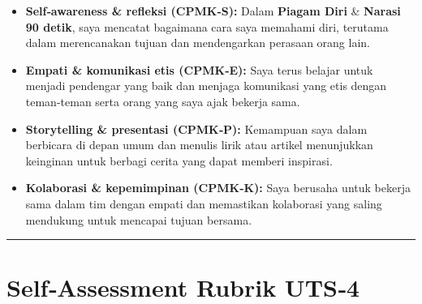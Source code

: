 \documentclass[
  letterpaper,
  DIV=11,
  numbers=noendperiod]{scrreprt}
\providecommand{\tightlist}{%
  \setlength{\itemsep}{0pt}\setlength{\parskip}{0pt}}
\begin{document}
\begin{itemize}
\tightlist
\item
  \textbf{Self‑awareness \& refleksi (CPMK‑S):} Dalam \textbf{Piagam
  Diri} \& \textbf{Narasi 90 detik}, saya mencatat bagaimana cara saya
  memahami diri, terutama dalam merencanakan tujuan dan mendengarkan
  perasaan orang lain.
\item
  \textbf{Empati \& komunikasi etis (CPMK‑E):} Saya terus belajar untuk
  menjadi pendengar yang baik dan menjaga komunikasi yang etis dengan
  teman-teman serta orang yang saya ajak bekerja sama.
\item
  \textbf{Storytelling \& presentasi (CPMK‑P):} Kemampuan saya dalam
  berbicara di depan umum dan menulis lirik atau artikel menunjukkan
  keinginan untuk berbagi cerita yang dapat memberi inspirasi.
\item
  \textbf{Kolaborasi \& kepemimpinan (CPMK‑K):} Saya berusaha untuk
  bekerja sama dalam tim dengan empati dan memastikan kolaborasi yang
  saling mendukung untuk mencapai tujuan bersama.
\end{itemize}

\begin{center}\rule{0.5\linewidth}{0.5pt}\end{center}

\section{Self‑Assessment Rubrik UTS‑4}\label{selfassessment-rubrik-uts4}
\end{document}
